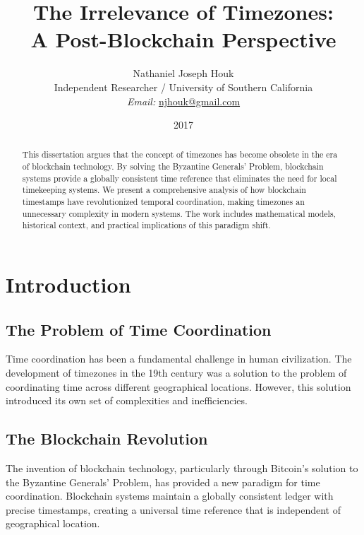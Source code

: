 \documentclass[12pt]{report}
\begin{document}
\title{The Irrelevance of Timezones: \\ A Post-Blockchain Perspective}

\author{Nathaniel Joseph Houk\\
Independent Researcher / University of Southern California\\
\textit{Email:} \href{mailto:njhouk@gmail.com}{njhouk@gmail.com}}
\date{2017}

\maketitle

\begin{abstract}
This dissertation argues that the concept of timezones has become obsolete in the era of blockchain technology. By solving the Byzantine Generals' Problem, blockchain systems provide a globally consistent time reference that eliminates the need for local timekeeping systems. We present a comprehensive analysis of how blockchain timestamps have revolutionized temporal coordination, making timezones an unnecessary complexity in modern systems. The work includes mathematical models, historical context, and practical implications of this paradigm shift.
\end{abstract}

\chapter{Introduction}

\section{The Problem of Time Coordination}
Time coordination has been a fundamental challenge in human civilization. The development of timezones in the 19th century was a solution to the problem of coordinating time across different geographical locations. However, this solution introduced its own set of complexities and inefficiencies.

\section{The Blockchain Revolution}
The invention of blockchain technology, particularly through Bitcoin's solution to the Byzantine Generals' Problem, has provided a new paradigm for time coordination. Blockchain systems maintain a globally consistent ledger with precise timestamps, creating a universal time reference that is independent of geographical location.
\end{document}
